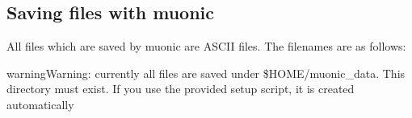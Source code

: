 \documentclass[letterpaper,10pt,english]{sphinxmanual}
\begin{document}

\begin{fulllineitems}
\label{tutorial:cmdoption-muonic-p}
\end{fulllineitems}


\begin{fulllineitems}
\label{tutorial:cmdoption-muonic-n}
\end{fulllineitems}



\subsection{Saving files with muonic}
\label{tutorial:saving-files-with-muonic}
All files which are saved by muonic are ASCII files. The filenames are as follows:

\begin{notice}{warning}{Warning:}
currently all files are saved under \$HOME/muonic\_data. This directory must exist. If you use the provided setup script, it is created automatically
\end{notice}
\end{document}
